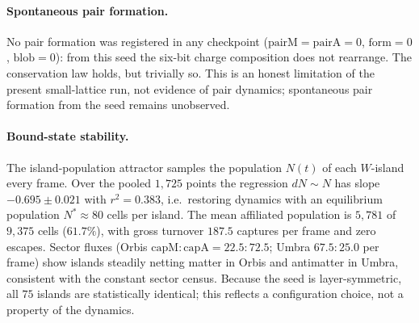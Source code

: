 \documentclass{ijuc}
\begin{document}
\paragraph{Spontaneous pair formation.} No pair formation was registered in any checkpoint ($\mathrm{pairM}=\mathrm{pairA}=0$, $\mathrm{form}=0$, $\mathrm{blob}=0$): from this seed the six-bit charge composition does not rearrange.  The conservation law holds, but trivially so.  This is an honest limitation of the present small-lattice run, not evidence of pair dynamics; spontaneous pair formation from the seed remains unobserved.

\paragraph{Bound-state stability.} The island-population attractor samples the population $N(t)$ of each $W$-island every frame.  Over the pooled $1{,}725$ points the regression $dN\sim N$ has slope $-0.695\pm0.021$ with $r^{2}=0.383$, i.e.\ restoring dynamics with an equilibrium population $N^{*}\approx80$ cells per island.  The mean affiliated population is $5{,}781$ of $9{,}375$ cells ($61.7\%$), with gross turnover $187.5$ captures per frame and zero escapes.  Sector fluxes (Orbis $\mathrm{capM}{:}\mathrm{capA}=22.5{:}72.5$; Umbra $67.5{:}25.0$ per frame) show islands steadily netting matter in Orbis and antimatter in Umbra, consistent with the constant sector census.  Because the seed is layer-symmetric, all $75$ islands are statistically identical; this reflects a configuration choice, not a property of the dynamics.
\end{document}
